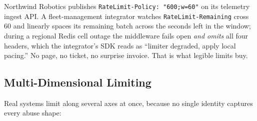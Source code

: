 \begin{examplebox}
Northwind Robotics publishes \texttt{RateLimit-Policy: "600;w=60"} on its
telemetry ingest API. A fleet-management integrator watches
\texttt{RateLimit-Remaining} cross 60 and linearly spaces its remaining
batch across the seconds left in the window; during a regional Redis cell
outage the middleware fails open \emph{and omits} all four headers, which
the integrator's SDK reads as ``limiter degraded, apply local pacing.'' No
page, no ticket, no surprise invoice. That is what legible limits buy.
\end{examplebox}

\subsection{Multi-Dimensional Limiting}
\label{subsec:ch14-multidim}

Real systems limit along several axes at once, because no single identity
captures every abuse shape:

